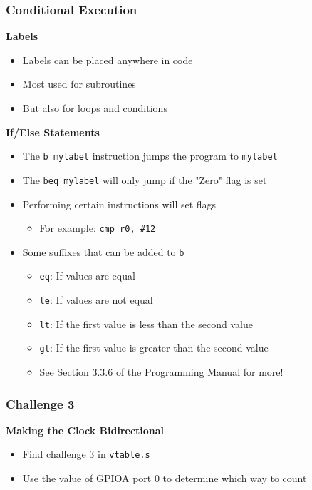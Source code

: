 \documentclass{beamer}
\begin{document}
\begin{frame}
    \frametitle{Conditional Execution}
	\textbf{Labels}
    \begin{itemize}
        \item Labels can be placed anywhere in code
		\item Most used for subroutines
		\item But also for loops and conditions
    \end{itemize}
    \textbf{If/Else Statements}
    \begin{itemize}
		\item The \texttt{b mylabel} instruction jumps the program to \texttt{mylabel}
		\item The \texttt{beq mylabel} will only jump if the "Zero" flag is set
		\item Performing certain instructions will set flags
		\begin{itemize}
			\item For example: \texttt{cmp r0, \#12}
		\end{itemize}
		\item Some suffixes that can be added to \texttt{b}
		\begin{itemize}
			\item \texttt{\texttildelow eq}: If values are equal
			\item \texttt{\texttildelow le}: If values are not equal
			\item \texttt{\texttildelow lt}: If the first value is less than the second value
			\item \texttt{\texttildelow gt}: If the first value is greater than the second value
			\item See Section 3.3.6 of the Programming Manual for more!
		\end{itemize}
    \end{itemize}
\end{frame}

\begin{frame}
	\frametitle{Challenge 3}
	\textbf{Making the Clock Bidirectional}
	\begin{itemize}
		\item Find challenge 3 in \texttt{vtable.s}
		\item Use the value of GPIOA port 0 to determine which way to count
	\end{itemize}
\end{frame}
\end{document}
